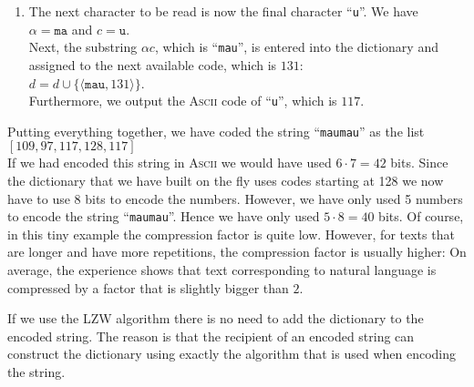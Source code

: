 \begin{enumerate}
\item The next character to be read is now the final character ``\texttt{u}''.  We have
      \\[0.2cm]
      \hspace*{1.3cm}
      $\alpha = \mathtt{ma}$ \quad and \quad $c = \mathtt{u}$.
      \\[0.2cm]
      Next, the substring $\alpha c$, which is ``\texttt{mau}'', is entered into the dictionary and
      assigned to the next available code, which is $131$:
      \\[0.2cm]
      \hspace*{1.3cm}
      $d = d \cup \{\langle \mathtt{mau}, 131 \rangle\}$.
      \\[0.2cm]
      Furthermore, we output the \textsc{Ascii} code of ``\texttt{u}'', which is $117$.
\end{enumerate} 
Putting everything together, we have coded the string ``\texttt{maumau}'' as the list
\\[0.2cm]
\hspace*{1.3cm}
$[109,97,117,128,117]$
\\[0.2cm]
If we had encoded this string in \textsc{Ascii} we would have used $6 \cdot 7 = 42$ bits.  Since the
dictionary that we have built on the fly uses codes starting at 128 we now have to use 8 bits to
encode the numbers.  However, we have only used 5 numbers to encode the string ``\texttt{maumau}''.
Hence we have only used $5 \cdot 8 = 40$ bits.   Of course, in this tiny example the compression
factor is quite low.  However, for texts that are longer and have more repetitions, the compression
factor is usually higher: On average, the experience shows that text corresponding to natural
language is compressed by a factor that is slightly bigger than $2$.

If we use the LZW algorithm there is no need to add the dictionary to the encoded string.  The
reason is that the recipient of an encoded string can construct the dictionary using exactly the
algorithm that is used when encoding the string.

